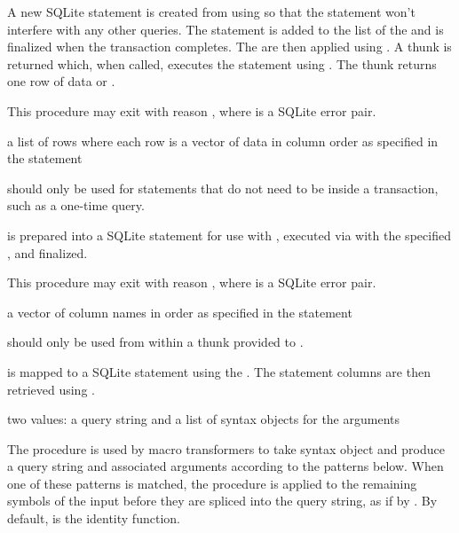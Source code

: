 A new SQLite statement is created from  using
 so that the statement won't interfere with
any other queries. The statement is added to the
 list of the  and is
finalized when the transaction completes.  The  are then
applied using . A thunk is returned which, when
called, executes the statement using . The thunk
returns one row of data or .

This procedure may exit with reason , where  is a SQLite error pair.

\begin{procedure}
\end{procedure}
\returns{}
a list of rows where each row is a vector of data in column order as
specified in the  statement

 should only be used for statements that do not need to be inside a transaction, such as a one-time query.

 is prepared into a SQLite statement for use with , executed via  with the specified , and finalized.

This procedure may exit with reason , where  is a SQLite error pair.

\begin{procedure}
\end{procedure}
\returns{}
a vector of column names in order as specified in the  statement

 should only be used from within a thunk 
provided to .

 is mapped to a SQLite statement using the
. The statement columns are then retrieved
using .

\begin{procedure}\end{procedure}
\returns{} two values: a query string and a list of syntax objects for
the arguments

The  procedure is used by macro transformers to take
syntax object  and produce a query string and associated
arguments according to the patterns below.
When one of these patterns is matched, the  procedure is
applied to the remaining symbols of the input before they are spliced into the
query string, as if by .
By default,  is the identity function.

